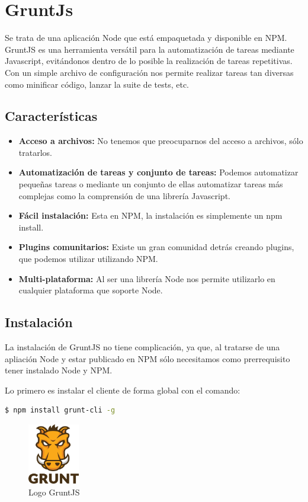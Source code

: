 \section{GruntJs}

Se trata de una aplicación Node que está empaquetada y disponible en NPM. GruntJS es una herramienta versátil para la automatización de tareas mediante Javascript, evitándonos dentro de lo posible la realización de tareas repetitivas. Con un simple archivo de configuración nos permite realizar tareas tan diversas como minificar código, lanzar la suite de tests, etc.


\subsection{Características}

\begin{itemize}
\item \textbf{Acceso a archivos:}
	No tenemos que preocuparnos del acceso a archivos, sólo tratarlos.	
\item \textbf{Automatización de tareas y conjunto de tareas:}
	Podemos automatizar pequeñas tareas o mediante un conjunto de ellas automatizar tareas más complejas como la comprensión de una librería Javascript. 
\item \textbf{Fácil instalación:}
	Esta en NPM, la instalación es simplemente un npm install.
\item \textbf{Plugins comunitarios:}
	Existe un gran comunidad detrás creando plugins, que podemos utilizar utilizando NPM.
\item \textbf{Multi-plataforma:}
	Al ser una librería Node nos permite utilizarlo en cualquier plataforma que soporte Node.
\end{itemize}

\subsection{Instalación}
La instalación de GruntJS no tiene complicación, ya que, al tratarse de una apliación Node y estar publicado en NPM sólo necesitamos como prerrequisito tener instalado Node y NPM.

Lo primero es instalar el cliente de forma global con el comando:

\begin{lstlisting}[language=bash, numbers=none]
$ npm install grunt-cli -g
\end{lstlisting}

\begin{figure}
  \begin{center}
    \includegraphics[width=0.2\textwidth]{imagenes/grunt-logo}
  \end{center}
  \caption{Logo GruntJS}
  \label{fig:gruntjs}
\end{figure}

